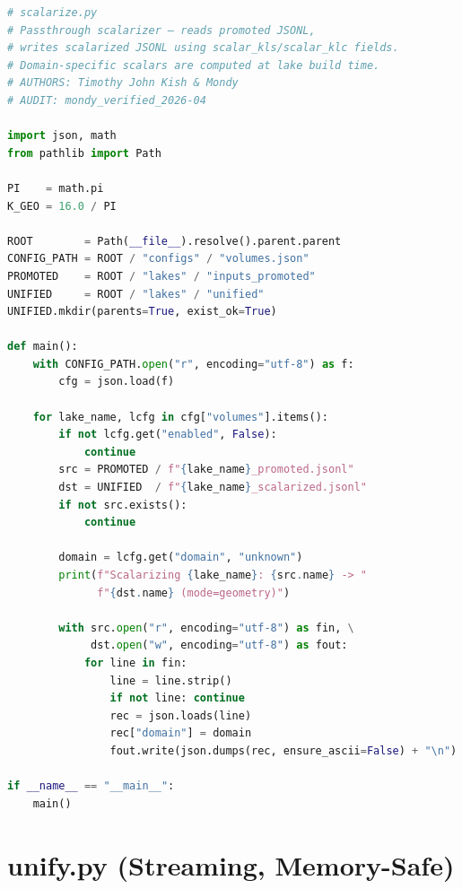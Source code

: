 \documentclass[11pt, letterpaper, openany]{book}
\begin{document}
\begin{lstlisting}[language=Python]
# scalarize.py
# Passthrough scalarizer — reads promoted JSONL,
# writes scalarized JSONL using scalar_kls/scalar_klc fields.
# Domain-specific scalars are computed at lake build time.
# AUTHORS: Timothy John Kish & Mondy
# AUDIT: mondy_verified_2026-04

import json, math
from pathlib import Path

PI    = math.pi
K_GEO = 16.0 / PI

ROOT        = Path(__file__).resolve().parent.parent
CONFIG_PATH = ROOT / "configs" / "volumes.json"
PROMOTED    = ROOT / "lakes" / "inputs_promoted"
UNIFIED     = ROOT / "lakes" / "unified"
UNIFIED.mkdir(parents=True, exist_ok=True)

def main():
    with CONFIG_PATH.open("r", encoding="utf-8") as f:
        cfg = json.load(f)

    for lake_name, lcfg in cfg["volumes"].items():
        if not lcfg.get("enabled", False):
            continue
        src = PROMOTED / f"{lake_name}_promoted.jsonl"
        dst = UNIFIED  / f"{lake_name}_scalarized.jsonl"
        if not src.exists():
            continue

        domain = lcfg.get("domain", "unknown")
        print(f"Scalarizing {lake_name}: {src.name} -> "
              f"{dst.name} (mode=geometry)")

        with src.open("r", encoding="utf-8") as fin, \
             dst.open("w", encoding="utf-8") as fout:
            for line in fin:
                line = line.strip()
                if not line: continue
                rec = json.loads(line)
                rec["domain"] = domain
                fout.write(json.dumps(rec, ensure_ascii=False) + "\n")

if __name__ == "__main__":
    main()
\end{lstlisting}

\section{unify.py (Streaming, Memory-Safe)}
\end{document}
